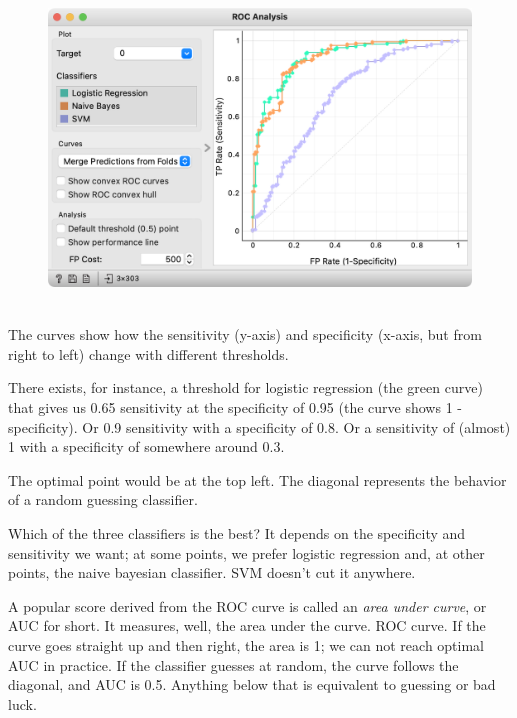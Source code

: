 \begin{figure}[h]
    \centering
    \includegraphics[scale=0.45]{roc-analysis.png}
    \caption{$\;$}
\end{figure}

The curves show how the sensitivity (y-axis) and specificity (x-axis, but from right to left) change with different thresholds.

There exists,
for instance, a threshold for logistic regression (the green curve) that gives us 0.65 sensitivity at the specificity of 0.95 (the curve shows 1 - specificity). Or 0.9 sensitivity with a specificity of 0.8. Or a sensitivity of (almost) 1 with a specificity of somewhere around 0.3.

The optimal point would be at the top left. The diagonal represents the behavior of a random guessing classifier.

Which of the three classifiers is the best? It depends on the specificity and sensitivity we want; at some points, we prefer logistic regression and, at other points, the naive bayesian classifier. SVM doesn’t cut it anywhere.

A popular score derived from the ROC curve is called an {\em area under curve}, or AUC for short. It measures, well, the area under the curve. ROC curve. If the curve goes straight up and then right, the area is 1; we can not reach optimal AUC in practice. If the classifier guesses at random, the curve follows the diagonal, and AUC is 0.5. Anything below that is equivalent to guessing or bad luck.

